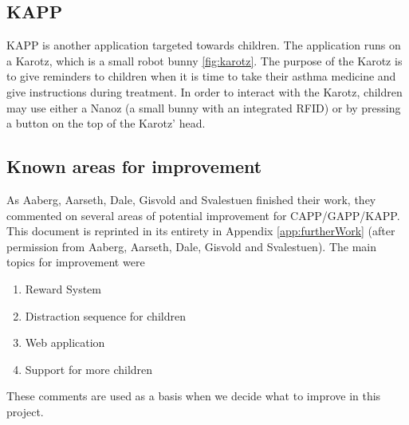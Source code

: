 

\subsection{KAPP}
KAPP is another application targeted towards children. The application runs on a Karotz\cite{karotz}, which is a small robot bunny \ref{fig:karotz}. The purpose of the Karotz is to give reminders to children when it is time to take their asthma medicine and give instructions during treatment. In order to interact with the Karotz, children may use either a Nanoz (a small bunny with an integrated RFID) or by pressing a button on the top of the Karotz' head.    



\subsection{Known areas for improvement}
\label{sec:improvements}
As Aaberg, Aarseth, Dale, Gisvold and Svalestuen finished their work, they commented on several areas of potential improvement for CAPP/GAPP/KAPP. This document is reprinted in its entirety in Appendix \ref{app:furtherWork} (after permission from Aaberg, Aarseth, Dale, Gisvold and Svalestuen). The main topics for improvement were
\begin{enumerate}
\item{Reward System}
\item{Distraction sequence for children}
\item{Web application}
\item{Support for more children}
\end{enumerate}

These comments are used as a basis when we decide what to improve in this project. 





